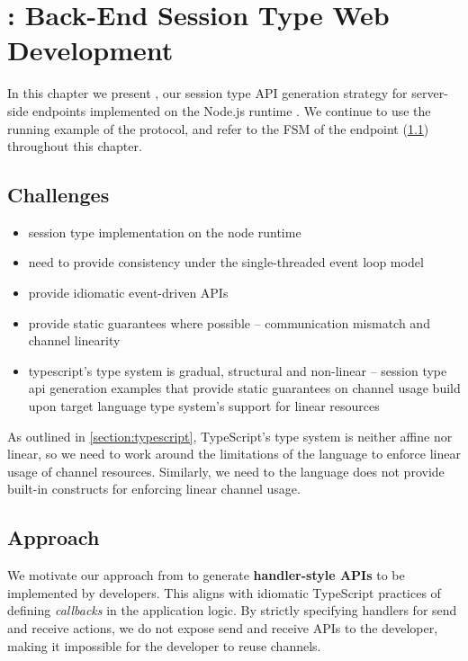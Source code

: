 \chapter{: Back-End Session Type Web Development}
\label{chap:node}

In this chapter we present ,
our session type API generation strategy for 
server-side endpoints implemented on the Node.js runtime \cite{node}.
We continue to use the running example of the 
protocol, and refer to the FSM of the  endpoint
(\cref{fig:addersvrfsm}) throughout this chapter.

\begin{figure}[!b]
\centering
\label{fig:addersvrfsm}
\end{figure}

\section{Challenges}
\label{section:nodechallenges}
\begin{itemize}
\item session type implementation on the node runtime
\item need to provide consistency under the single-threaded event loop model
\item provide idiomatic event-driven APIs
\item provide static guarantees where possible -- communication mismatch and channel linearity
\item typescript's type system is gradual, structural and non-linear -- session type api generation examples that provide static guarantees on channel usage build upon target language type system's support for linear resources
\end{itemize}

As outlined in \cref{section:typescript}, TypeScript's type system
is neither affine nor linear, so we need to work around the 
limitations of the language to enforce linear usage of channel resources.
Similarly, we need to 
the language does not provide
built-in constructs for enforcing linear channel usage.

\section{Approach}
\label{section:nodeapproach}

We motivate our approach from \cite{PureScript2019, HuJava}
to generate \textbf{handler-style APIs} to be implemented
by developers.
This aligns with idiomatic TypeScript practices of defining
\textit{callbacks} in the application logic.
By strictly specifying handlers for send and receive actions,
we do not expose send and receive APIs to the developer,
making it impossible for the developer to reuse channels.


